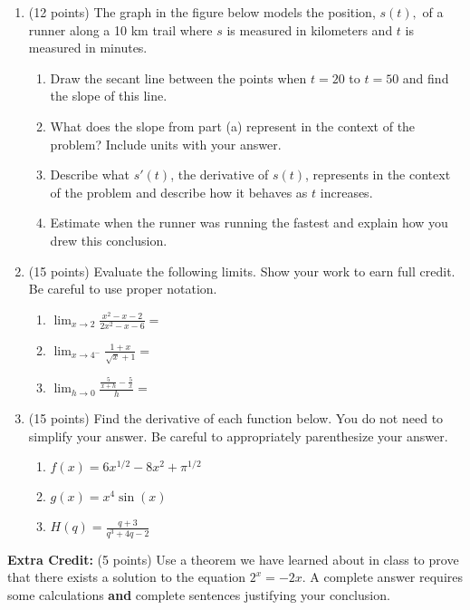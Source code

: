 \documentclass[12pt]{article}
\renewcommand{\emph}[1]{\textsf{\textbf{#1}}}
\begin{document}
\begin{enumerate}
\item (12 points) The graph in the figure below models the position, $s(t),$ of a runner along a 10 km trail where $s$ is measured in kilometers and $t$ is measured in minutes.\\
\begin{center}
\end{center}
\begin{enumerate}
\item Draw the secant line between the points when $t=20$ to $t=50$ and find the slope of this line. 
\vfill
\item What does the slope from part (a) represent in the context of the problem? Include units with your answer.
\vfill
\item Describe what $s'(t)$, the derivative of $s(t)$, represents in the context of the problem and describe how it behaves as $t$ increases. 
\vfill 

\item Estimate when the runner was running the fastest and explain how you drew this conclusion.
\vfill
\end{enumerate}
\newpage
\item (15 points) Evaluate the following limits. Show your work to earn full credit. Be careful to use proper notation.
	\begin{enumerate}
	\item $\displaystyle{\lim_{x \to 2 } \frac{x^2-x-2}{2x^2-x-6}= }$
	\vfill
	\item $\displaystyle{\lim_{x \to 4^-} \frac{1+x}{\sqrt{x} +1} =}$
	\vfill
	\item $\displaystyle{\lim_{h \to 0} \frac{\frac{5}{x+h}-\frac{5}{x}}{h}= }$
	\vfill
	\end{enumerate}
\newpage
\item (15 points) Find the derivative of each function below. You do not need to simplify your answer. Be careful to appropriately parenthesize your answer.
	\begin{enumerate}
	\item $f(x)=6x^{1/2}-8x^2+\pi^{1/2}$
	\vfill
	\item $g(x)=x^4\sin(x)$
	\vfill
	\item $H(q)=\frac{q+3}{q^3+4q-2}$
	\vfill
	\end{enumerate}

\end{enumerate}
\textbf{Extra Credit:} (5 points) Use a theorem we have learned about in class to prove that there exists a solution to the equation $2^x=-2x.$ A complete answer requires some calculations \emph{and} complete sentences justifying your conclusion.
\vspace{2.5in}
\end{document}
